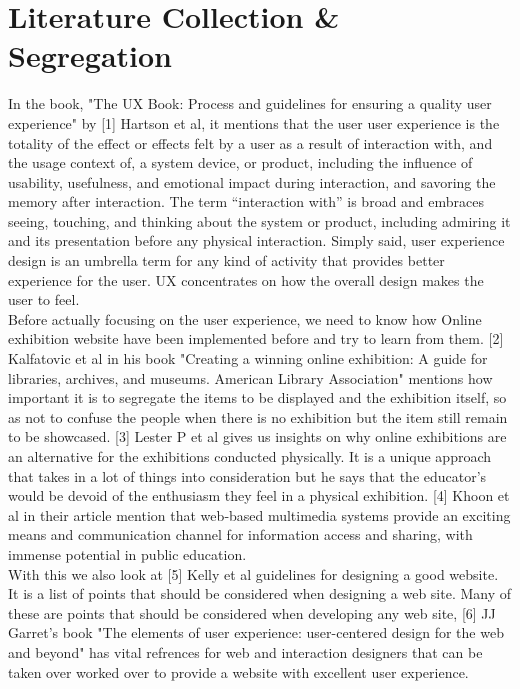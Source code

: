 \section{Literature Collection \& Segregation}
 In the book, "The UX Book: Process and guidelines for ensuring a quality user experience" by [1] Hartson et al, it mentions that the user user experience is the totality of the effect or effects felt by a user as a result of interaction with, and the usage context of, a system device, or product, including the influence of usability, usefulness, and emotional impact during interaction, and
 savoring the memory after interaction. The term “interaction with” is broad and embraces seeing, touching, and thinking about the system or product, including admiring it and its presentation before any physical interaction. Simply said, user experience design is an umbrella term for any kind of activity that provides better experience for
 the user. UX concentrates on how the overall design makes the user to feel. 
 \\
 Before actually focusing on the user experience, we need to know how Online exhibition website have been implemented before and try to learn from them.
 [2] Kalfatovic et al in his book "Creating a winning online exhibition: A guide for libraries, archives, and museums. American Library Association" mentions how important it is to segregate the items to be displayed and the exhibition itself, so as not to confuse the people when there is no exhibition but the item still remain to be showcased. [3] Lester P et al gives us insights on why online exhibitions are an alternative for the exhibitions conducted physically. It is a unique approach that takes in a lot of things into consideration but he says that the educator's would be devoid of the enthusiasm they feel in a physical exhibition. [4] Khoon et al in their article mention that web‐based multimedia systems provide an exciting means and communication channel for information access and sharing, with immense potential in public education.
 \\
 With this we also look at [5] Kelly et al guidelines for designing a good website. It is a list of points that should be considered when designing a web site. Many of these
 are points that should be considered when developing any web site, [6] JJ Garret's book "The elements of user experience: user-centered design for the web and beyond" has vital refrences for web and interaction designers that can be taken over worked over to provide a website with excellent user experience.
 

